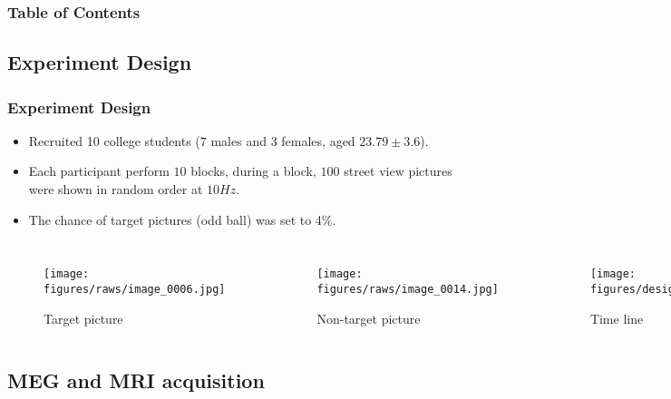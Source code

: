 \documentclass[aspectratio=169]{beamer}
\begin{document}
\begin{frame}[plain]
    \frametitle{Table of Contents}
\end{frame}

\subsection{Experiment Design}

\begin{frame}
    \frametitle{Experiment Design}

    \begin{itemize}
        \item Recruited 10 college students ($7$ males and $3$ females, aged $23.79 \pm 3.6$).
        \item Each participant perform $10$ blocks, during a block, $100$ street view pictures were shown in random order at $10 Hz$.
        \item The chance of target pictures (odd ball) was set to 4\%.
    \end{itemize}

    \begin{columns}

        \begin{figure}[h]
            \centering
            \texttt{[image: figures/raws/image\_0006.jpg]}
            \caption{Target picture}
        \end{figure}


        \begin{figure}[h]
            \centering
            \texttt{[image: figures/raws/image\_0014.jpg]}
            \caption{Non-target picture}
        \end{figure}


        \begin{figure}[h]
            \centering
            \texttt{[image: figures/design.png]}
            \caption{Time line}
        \end{figure}

    \end{columns}

\end{frame}

\subsection{MEG and MRI acquisition}
\end{document}
